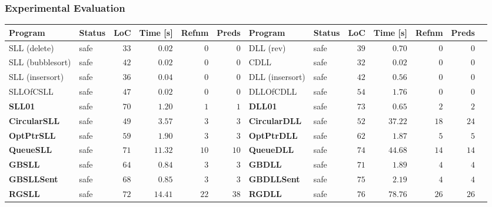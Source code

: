 \documentclass{beamer}
\newcommand{\safe}[0]{safe}
\begin{document}
\begin{frame}
\frametitle{Experimental Evaluation}

	\begin{center}
	\begin{adjustbox}{max height=\textheight, max width=\textwidth}
	\begin{tabular}{| l | l | r | r | r | r || l | l | r | r | r | r | r |}
        \hline
		Program & Status & LoC & Time [s] & Refnm& Preds & Program & Status & LoC & Time [s] & Refnm & Preds \\
        \hline
        \hline
		SLL (delete) & \safe & $33$ & $0.02$ &  $0$ & $0$ & DLL (rev) & \safe & $39$ &  $0.70$ & $0$  & $0$ \\
        \hline
		SLL (bubblesort) & \safe & $42$ & $0.02$ &  $0$ & $0$ & CDLL & \safe & $32$ &  $0.02$  & $0$  & $0$ \\
        \hline
		SLL (insersort) & \safe & $36$ & $0.04$ & $0$ & $0$ & DLL (insersort) & \safe & $42$ &  $0.56$  & $0$  & $0$ \\
        \hline
		SLLOfCSLL & \safe & $47$ & $0.02$ & $0$ & $0$ & DLLOfCDLL & \safe & $54$ &  $1.76$  & $0$  & $0$ \\
        \hline
		\rowcolor{rowgray}
		\textbf{SLL01}    & \safe & $70$ & $1.20$   &  $1$ & $1$ & \textbf{DLL01} & \safe & $73$ &  $0.65$  & $2$  & $2$ \\
        \hline
		\rowcolor{rowgray}
		\textbf{CircularSLL} & \safe & $49$ & $3.57$   &  $3$  & $3$ & \textbf{CircularDLL} & \safe  & $52$ &  $37.22$ & $18$ & $24$ \\
        \hline
		\rowcolor{rowgray}
		\textbf{OptPtrSLL}   & \safe & $59$ & $1.90$ & $3$ & $3$ & \textbf{OptPtrDLL} & \safe & $62$ &  $1.87$  & $5$ & $5$ \\
        \hline
		\rowcolor{rowgray}
		\textbf{QueueSLL}    & \safe & $71$ & $11.32$  &  $10$ & $10$ & \textbf{QueueDLL} & \safe  & $74$ &  $44.68$ & $14$ & $14$ \\
		\rowcolor{rowgray}
        \hline
		\textbf{GBSLL}       & \safe & $64$ & $0.84$   &  $3$ & $3$ & \textbf{GBDLL} & \safe & $71$ &  $1.89$  & $4$ & $4$ \\
        \hline
		\rowcolor{rowgray}
		\textbf{GBSLLSent}   & \safe  & $68$ & $0.85$   &  $3$ & $3$ & \textbf{GBDLLSent} & \safe & $75$ &  $2.19$  & $4$ & $4$ \\
        \hline
		\rowcolor{rowgray}
		\textbf{RGSLL}       & \safe & $72$ & $14.41$  &  $22$  & $38$ & \textbf{RGDLL} & \safe & $76$ &  $78.76$ & $26$ & $26$ \\

\end{tabular}
\end{adjustbox}
\end{center}
\end{frame}
\end{document}
